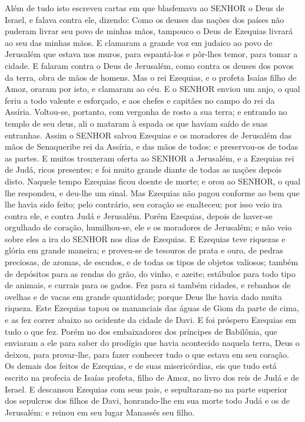 {Além de tudo isto escreveu cartas em que blasfemava ao SENHOR o Deus de Israel, e falava contra ele, dizendo: Como os deuses das nações dos países não puderam livrar seu povo de minhas mãos, tampouco o Deus de Ezequias livrará ao seu das minhas mãos.
E clamaram a grande voz em judaico ao povo de Jerusalém que estava nos muros, para espantá-los e pôr-lhes temor, para tomar a cidade.
E falaram contra o Deus de Jerusalém, como contra os deuses dos povos da terra, obra de mãos de homens.
Mas o rei Ezequias, e o profeta Isaías filho de Amoz, oraram por isto, e clamaram ao céu.
E o SENHOR enviou um anjo, o qual feriu a todo valente e esforçado, e aos chefes e capitães no campo do rei da Assíria. Voltou-se, portanto, com vergonha de rosto a sua terra; e entrando no templo de seu deus, ali o mataram à espada os que haviam saído de suas entranhas.
Assim o SENHOR salvou Ezequias e os moradores de Jerusalém das mãos de Senaqueribe rei da Assíria, e das mãos de todos: e preservou-os de todas as partes.
E muitos trouxeram oferta ao SENHOR a Jerusalém, e a Ezequias rei de Judá, ricos presentes; e foi muito grande diante de todas as nações depois disto.
Naquele tempo Ezequias ficou doente de morte; e orou ao SENHOR, o qual lhe respondeu, e deu-lhe um sinal.
Mas Ezequias não pagou conforme ao bem que lhe havia sido feito; pelo contrário, seu coração se enalteceu; por isso veio ira contra ele, e contra Judá e Jerusalém.
Porém Ezequias, depois de haver-se orgulhado de coração, humilhou-se, ele e os moradores de Jerusalém; e não veio sobre eles a ira do SENHOR nos dias de Ezequias.
E Ezequias teve riquezas e glória em grande maneira; e proveu-se de tesouros de prata e ouro, de pedras preciosas, de aromas, de escudos, e de todas os tipos de objetos valiosos;
também de depósitos para as rendas do grão, do vinho, e azeite; estábulos para todo tipo de animais, e currais para os gados.
Fez para si também cidades, e rebanhos de ovelhas e de vacas em grande quantidade; porque Deus lhe havia dado muita riqueza.
Este Ezequias tapou os mananciais das águas de Giom da parte de cima, e as fez correr abaixo ao ocidente da cidade de Davi. E foi próspero Ezequias em tudo o que fez.
Porém no dos embaixadores dos príncipes de Babilônia, que enviaram a ele para saber do prodígio que havia acontecido naquela terra, Deus o deixou, para provar-lhe, para fazer conhecer tudo o que estava em seu coração.
Os demais dos feitos de Ezequias, e de suas misericórdias, eis que tudo está escrito na profecia de Isaías profeta, filho de Amoz, no livro dos reis de Judá e de Israel.
E descansou Ezequias com seus pais, e sepultaram-no na parte superior dos sepulcros dos filhos de Davi, honrando-lhe em sua morte todo Judá e os de Jerusalém: e reinou em seu lugar Manassés seu filho.

}
